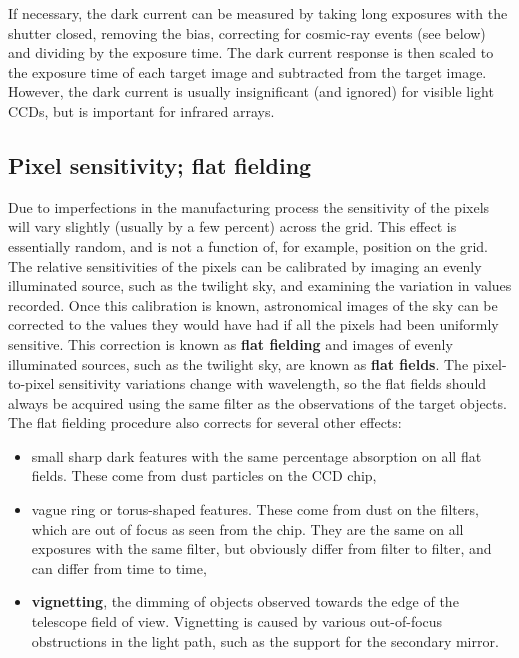 \documentclass[twoside,11pt]{article}
\begin{document}
If necessary, the dark current can be measured by taking long exposures with
the shutter closed, removing the bias, correcting for cosmic-ray events (see
below) and dividing by the exposure time.  The dark current response is then
scaled to the exposure time of each target image and subtracted from the
target image.  However, the dark current is usually insignificant (and
ignored) for visible light CCDs, but is important for infrared arrays.

\subsection{Pixel sensitivity; flat fielding}

Due to imperfections in the manufacturing process the sensitivity of
the pixels will vary slightly (usually by a few percent) across the
grid.  This effect is essentially random, and is not a function of,
for example, position on the grid.  The relative sensitivities of the
pixels can be calibrated by imaging an evenly illuminated source, such as
the twilight sky, and examining the variation in values recorded.  Once this
calibration is known, astronomical images of the sky can be corrected to
the values they would have had if all the pixels had been uniformly
sensitive.  This correction is known as {\bf flat fielding}
and images of evenly illuminated sources, such as the twilight sky, are
known as {\bf flat fields}.  The pixel-to-pixel sensitivity variations
change with wavelength, so the flat fields should always be acquired
using the same filter as the observations of the target objects.
The flat fielding procedure also corrects for several other effects:

\begin{itemize}

  \item small sharp dark features with the same percentage absorption on
   all flat fields. These come from dust particles on the CCD chip,

  \item vague ring or torus-shaped features.  These come from dust on the
    filters, which are out of focus as seen from the chip.  They are
    the same on all exposures with the same filter, but obviously
    differ from filter to filter, and can differ from time to time,

  \item {\bf vignetting}, the dimming of objects observed towards the edge
   of the telescope field of view.  Vignetting is caused by various
   out-of-focus obstructions in the light path, such as the support for the
   secondary mirror.

\end{itemize}
\end{document}
